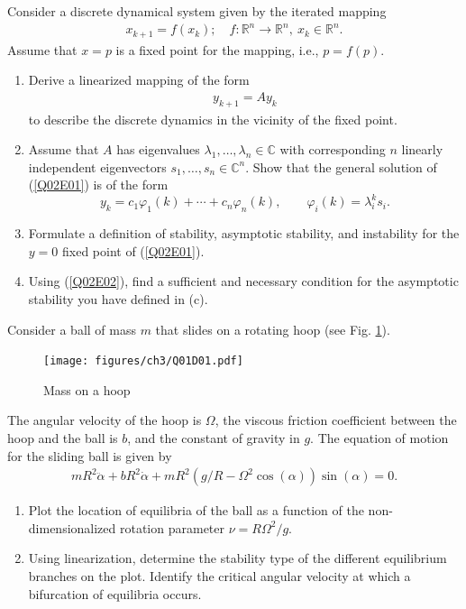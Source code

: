 \begin{exercise}
Consider a discrete dynamical system given by the iterated mapping
\begin{align}
	x_{k+1} = f(x_k); \quad f: \mathbb{R}^n \rightarrow \mathbb{R}^n,\ x_k \in \mathbb{R}^n.
\end{align}
Assume that $x = p$ is a fixed point for the mapping, i.e., $p = f(p)$.

\begin{enumerate}[label=(\alph*)]
	\item Derive a linearized mapping of the form
	\begin{align}\label{Q02E01}
		y_{k+1} = Ay_k
	\end{align}
	to describe the discrete dynamics in the vicinity of the fixed point.
	\item Assume that $A$ has eigenvalues $\lambda_1, \ldots, \lambda_n \in \mathbb{C}$ with corresponding $n$ linearly independent eigenvectors $s_1, \ldots, s_n \in \mathbb{C}^n$. Show that the general solution of (\ref{Q02E01}) is of the form
	\begin{equation}\label{Q02E02}
		y_k = c_1 \varphi_1(k) + \cdots + c_n \varphi_n(k), \qquad \varphi_i(k) = \lambda_i^ks_i.
	\end{equation}
	\item Formulate a definition of stability, asymptotic stability, and instability for the $y=0$ fixed point of (\ref{Q02E01}).
	\item Using (\ref{Q02E02}), find a sufficient and necessary condition for the asymptotic stability you have defined in (c).
\end{enumerate}
\end{exercise}

\begin{exercise} \label{s3q1}
Consider a ball of mass $m$ that slides on a rotating hoop (see Fig. \ref{3Q01D01}).

\begin{figure}[h]
	\centering
	\texttt{[image: figures/ch3/Q01D01.pdf]}
	\caption{Mass on a hoop}
	\label{3Q01D01}
\end{figure}
The angular velocity of the hoop is $\Omega$, the viscous friction coefficient between the hoop and the ball is $b$, and the constant of gravity in $g$. The equation of motion for the sliding ball is given by
\begin{align}
	mR^2 \ddot{\alpha} + bR^2 \dot{\alpha} + mR^2(g/R - \Omega^2 \cos(\alpha)) \sin(\alpha) = 0.
\end{align}

\begin{enumerate}[label=(\alph*)]
	\item Plot the location of equilibria of the ball as a function of the non-dimensionalized rotation parameter $\nu = R\Omega^2 /g$.
	\item Using linearization, determine the stability type of the different equilibrium branches on the plot. Identify the critical angular velocity at which a bifurcation of equilibria occurs.
\end{enumerate}

\end{exercise}



